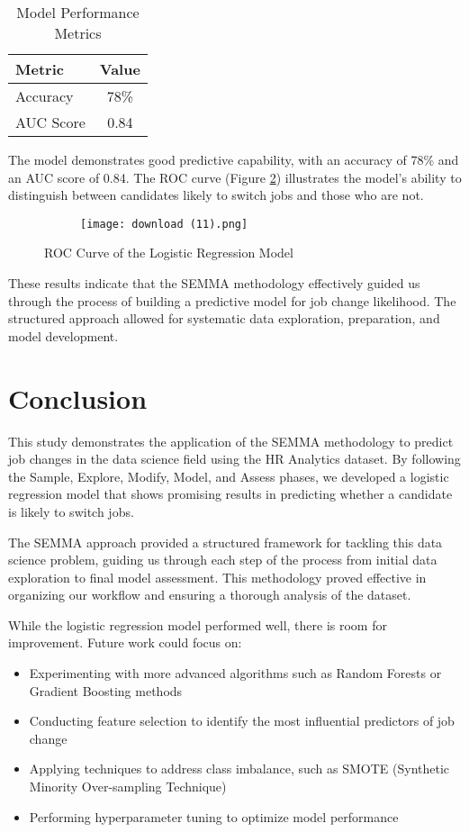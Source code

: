 \documentclass[12pt]{article}
\begin{document}
\begin{table}[h]
\centering
\begin{tabular}{lc}
\toprule
Metric & Value \\
\midrule
Accuracy & 78\% \\
AUC Score & 0.84 \\
\bottomrule
\end{tabular}
\caption{Model Performance Metrics}
\label{tab:performance}
\end{table}

The model demonstrates good predictive capability, with an accuracy of 78\% and an AUC score of 0.84. The ROC curve (Figure \ref{fig:roc_curve}) illustrates the model's ability to distinguish between candidates likely to switch jobs and those who are not.

\begin{figure}[H]
\begin{figure}
    \centering
    \texttt{[image: download (11).png]}
    \label{fig:enter-label}
\end{figure}
\caption{ROC Curve of the Logistic Regression Model}
\label{fig:roc_curve}
\end{figure}

These results indicate that the SEMMA methodology effectively guided us through the process of building a predictive model for job change likelihood. The structured approach allowed for systematic data exploration, preparation, and model development.

\section{Conclusion}
This study demonstrates the application of the SEMMA methodology to predict job changes in the data science field using the HR Analytics dataset. By following the Sample, Explore, Modify, Model, and Assess phases, we developed a logistic regression model that shows promising results in predicting whether a candidate is likely to switch jobs.

The SEMMA approach provided a structured framework for tackling this data science problem, guiding us through each step of the process from initial data exploration to final model assessment. This methodology proved effective in organizing our workflow and ensuring a thorough analysis of the dataset.

While the logistic regression model performed well, there is room for improvement. Future work could focus on:
\begin{itemize}
    \item Experimenting with more advanced algorithms such as Random Forests or Gradient Boosting methods
    \item Conducting feature selection to identify the most influential predictors of job change
    \item Applying techniques to address class imbalance, such as SMOTE (Synthetic Minority Over-sampling Technique)
    \item Performing hyperparameter tuning to optimize model performance
\end{itemize}
\end{document}
